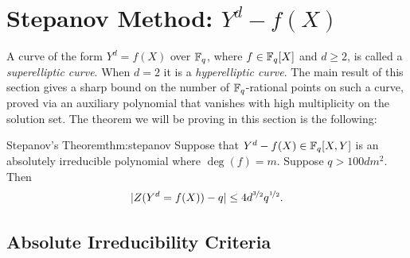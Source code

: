 \section{Stepanov Method: \texorpdfstring{$Y^d-f(X)$}{ Yd-f(X)}}\label{sec:stepanov}
A curve of the form $Y^d=f(X)$ over $\mathbb{F}_q$, where $f\in\mathbb{F}_q[X]$ and $d\geq 2$, is called a \emph{superelliptic curve}. When $d=2$ it is a \emph{hyperelliptic curve}. The main result of this section gives a sharp bound on the number of $\mathbb{F}_q$-rational points on such a curve, proved via an auxiliary polynomial that vanishes with high multiplicity on the solution set. The theorem we will be proving in this section is the following:
\begin{Theorem}{Stepanov's Theorem}{thm:stepanov}
  Suppose that $Y^d-f(X)\in\mathbb{F}_q[X,Y]$ is an absolutely irreducible polynomial where $\deg(f)=m$.  Suppose $q>100dm^2$.  Then $$|Z(Y^d=f(X))-q|\leq 4d^{\nicefrac32}q^{\nicefrac12}.$$
\end{Theorem}

\subsection{Absolute Irreducibility Criteria}

